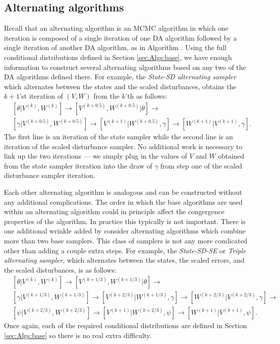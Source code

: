 \documentclass{article}
\begin{document}
\subsection{Alternating algorithms}\label{sec:Algs:alt}
Recall that an alternating algorithm is an MCMC algorithm in which one iteration is composed of a single iteration of one DA algorithm followed by a single iteration of another DA algorithm, as in Algorithm . Using the full conditional distributions defined in Section \ref{sec:Algs:base}, we have enough information to construct several alternating algorithms based on any two of the DA algorithms defined there. For example, the {\it State-SD alternating sampler} which alternates between the states and the scaled disturbances, obtains the $k+1$'st iteration of $(V,W)$ from the $k$'th as follows:
\begin{align*}
&[\theta|V^{(k)},W^{(k)}] \to [V^{(k+0.5)},W^{(k+0.5)}|\theta] \to\\ 
&[\gamma|V^{(k+0.5)},W^{(k+0.5)}] \to [V^{(k+1)}|W^{(k+0.5)},\gamma] \to [W^{(k+1)}|V^{(k+1)},\gamma].
\end{align*}
The first line is an iteration of the state sampler while the second line is an iteration of the scaled disturbance sampler. No additional work is necessary to link up the two iterations --- we simply plug in the values of $V$ and $W$ obtained from the state sampler iteration into the draw of $\gamma$ from step one of the scaled disturbance sampler iteration.

Each other alternating algorithm is analogous and can be constructed without any additional complications. The order in which the base algorithms are used within an alternating algorithm could in principle affect the congergence properties of the algorithm. In practice this typically is not important. There is one additional wrinkle added by consider alternating algorithms which combine more than two base samplers. This class of samplers is not any more comlicated other than adding a couple extra steps. For example, the {\it State-SD-SE} or {\it Triple alternating sampler}, which alternates between the states, the scaled errors, and the scaled disturbances, is as follows:
\begin{align*}
&[\theta|V^{(k)},W^{(k)}] \to [V^{(k+1/3)},W^{(k+1/3)}|\theta] \to\\ 
&[\gamma|V^{(k+1/3)},W^{(k+1/3)}] \to [V^{(k+2/3)}|W^{(k+1/3)},\gamma] \to [W^{(k+2/3)}|V^{(k+2/3)},\gamma]\to \\
&[\psi|V^{(k+2/3)},W^{(k+2/3)}] \to [V^{(k+1)}|W^{(k+2/3)},\psi] \to [W^{(k+1)}|V^{(k+1)},\psi].
\end{align*}
Once again, each of the required conditional distributions are defined in Section \ref{sec:Algs:base} so there is no real extra difficulty.
\end{document}

